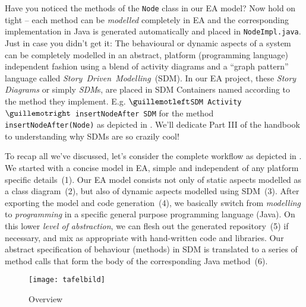 Have you noticed the methods of the \texttt{Node} class in our EA model?  Now hold on tight -- each method can be \emph{modelled} completely in EA and the
corresponding implementation in Java is generated automatically and placed in \texttt{NodeImpl.java}. Just in case you didn't get it: The behavioural or dynamic
aspects of a system can be completely modelled in an abstract, platform (programming language) independent fashion using a blend of activity  diagrams and a ``graph pattern'' language called \textit{Story~Driven~Modelling}~(SDM). In our EA project, these
\emph{Story Diagrams} or simply \emph{SDM}s, are placed in SDM Containers named according to the method they implement. E.g.  \texttt{$\guillemotleft$SDM
Activity$\guillemotright$ insertNodeAfter SDM} for the method \texttt{insertNodeAft\-er(Node)} as depicted in .  We'll dedicate
Part III of the handbook to understanding why SDMs are so  {\huge crazily} cool!

To recap all we've discussed, let's consider the complete workflow as depicted in . We started with a concise model in EA, simple and
independent of any platform specific details~(1).  Our EA model consists not only of static aspects modelled as a class diagram~(2), but also of dynamic aspects
modelled using SDM~(3).  After exporting the model and code generation~(4), we basically switch from \emph{modelling} to \emph{programming} in a specific
general purpose programming language (Java). On this lower \emph{level of abstraction}, we can flesh out the generated repository~(5) if necessary, and mix as
appropriate with hand-written code and libraries.  Our abstract specification of behaviour (methods) in SDM is translated to a series of method calls that form
the body of the corresponding Java method~(6).

\begin{figure}[htbp]
	\centering
  \texttt{[image: tafelbild]}
	\caption{Overview}
	\label{fig:Overview}
\end{figure}


\clearpage
